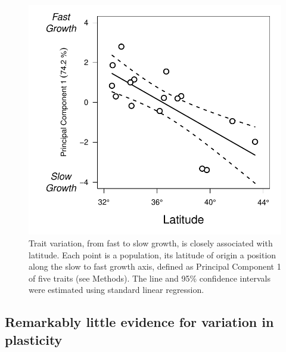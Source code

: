 \documentclass[11pt, oneside]{article}
\begin{document}

\begin{figure}[h!]
	\centerline{\includegraphics[width=1\textwidth]{Figures/Figure_PC1vLat.pdf}}
	\fontsize{10}{12}
	\selectfont
	\caption[Southern populations grow faster]{Trait variation, from fast to slow growth, is closely associated with latitude. Each point is a population, its latitude of origin a position along the slow to fast growth axis, defined as Principal Component 1 of five traits (see Methods). The line and 95\% confidence intervals were estimated using standard linear regression.}
	\label{fig:Fig_PC1vLat}
\end{figure}

\subsection*{Remarkably little evidence for variation in plasticity}
\end{document}
